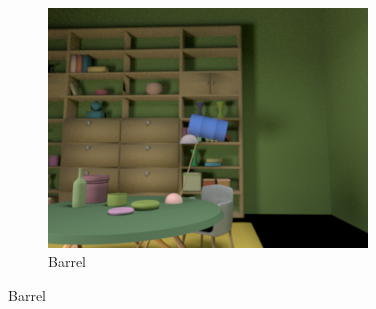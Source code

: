 \documentclass{jov}
\begin{document}
\begin{figure}[h]
    ~ %
    \begin{subfigure}[b]{0.22 \textwidth}
        \includegraphics[width=\textwidth]{../Figures/Figure10/Figure10_c.png}
        \caption{Barrel}
        \label{fig:libraryWithBarrel}
    \end{subfigure}
    

\end{figure}
\end{document}
